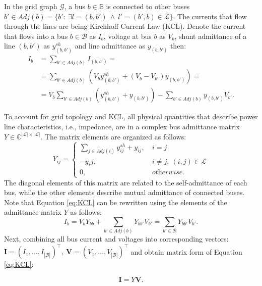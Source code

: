 In the grid graph $\mathcal{G}$, a bus $b \in \mathbb{B}$ is connected to other buses $b' \in \textit{Adj}(b) = \{ b':~ \exists l = (b, b') ~\wedge~l' = (b', b) \in \mathcal{L} \}$.
The currents that flow through the lines are being Kirchhoff Current Law (KCL). 
Denote the current that flows into a bus $b\in \mathcal{B}$ as $I_b$, voltage at bus $b$ as $V_b$, shunt admittance of a line $(b, b')$ as $y^{sh}_{(b, b')}$ and line admittance as $y_{(b, b')}$ then:
\begin{equation}
    \begin{aligned}
        I_b &= \sum_{b' \in \textit{Adj}(b)} I_{(b,b')} = \\
            &= \sum_{b' \in \textit{Adj}(b)} \left( V_b y^{sh}_{(b, b')} + (V_b - V_{b'})y_{(b, b')} \right) = \\
            &= V_b\sum_{b' \in \textit{Adj}(b)} \left( y^{sh}_{(b, b')} + y_{(b, b')} \right) - \sum_{b' \in \textit{Adj}(b)} y_{(b,b')} V_{b'}.
    \end{aligned}
    \label{eq:KCL}
\end{equation}

To account for grid topology and KCL, all physical quantities that describe power line characteristics, i.e., impedance, are in a complex bus admittance matrix $Y \in \mathbb{C}^{|\mathcal{L}| \times |\mathcal{L}|}$. The matrix elements are organized as follows:
$$
Y_{ij} = 
\begin{cases}
\sum_{j \in \textit{Adj}(i)} y^{sh}_{ij} + y_{ij},& ~ i = j \\
-y_ij,& ~ i \neq j, ~ (i,j) \in \mathcal{L} \\
0, & ~ \textit{otherwise}.
\end{cases}
$$
The diagonal elements of this matrix are related to the self-admittance of each bus, while the other elements describe mutual admittance of connected buses.
Note that Equation \eqref{eq:KCL} can be rewritten using the elements of the admittance matrix $Y$ as follows:
\begin{equation}
    I_b =V_b Y_{bb} + \sum_{b' \in \textit{Adj}(b)} Y_{bb'}V_{b'} = \sum_{b' \in \mathcal{B}} Y_{bb'}V_{b'}.
    \label{eq:current_amd_V}
\end{equation}
Next, combining all bus current and voltages into corresponding vectors: $\boldsymbol{I} = (I_1, \dots, I_{|\mathcal{B}|})^\top, ~ \boldsymbol{V} = (V_1, \dots, V_{|\mathcal{B}|})^\top$ and obtain matrix form of Equation \eqref{eq:KCL}:

\begin{equation}
    \boldsymbol{I} = Y \boldsymbol{V}.
    \label{eq:KCL_matrix}
\end{equation}

